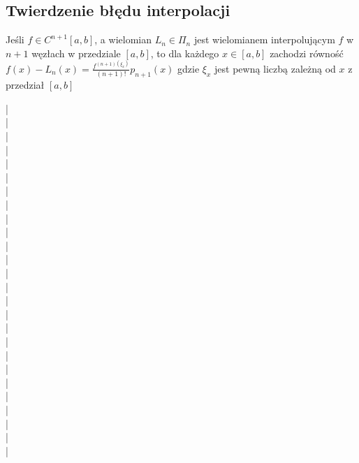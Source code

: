 \documentclass{article}
\begin{document}
\begin{minipage}[t]{.33\textwidth}
\subsection*{Twierdzenie błędu interpolacji}
Jeśli $f \in C^{n+1}[a,b]$, a wielomian $L_n \in \Pi_n$ jest 
wielomianem interpolującym $f$ w $n+1$ węzłach w przedziale $[a,b]$, to dla każdego $x \in [a,b]$
zachodzi równość $f(x) - L_n(x) = \frac{f^{(n+1)(\xi_x)}}{(n+1)!}p_{n+1}(x)$
gdzie $\xi_x$ jest pewną liczbą zależną od $x$ z przedział $[a,b]$
\end{minipage}
\begin{minipage}[t]{.005\textwidth}
    |\\|\\|\\|\\|\\|\\|\\|\\|\\|\\|\\|\\|\\|\\|\\|\\|\\|\\|\\|\\|\\|\\|\\|\\|\\|\
\end{minipage}
\end{document}
